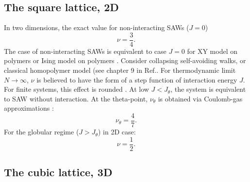\subsection{The square lattice, 2D}

In two dimensions, the exact value for non-interacting SAWs ($J=0$)\cite{Li1995}
\begin{equation}
\label{nur}
\nu = \frac{3}{4}. 
\end{equation}
The case of non-interacting SAWs is equivalent to case $J=0$ for XY model on polymers or Ising model on polymers   \cite{PhysRevE.104.054501}.  
Consider collapsing self-avoiding walks, or classical homopolymer model (see chapter 9 in Ref.\cite{van2015statistical}. For thermodynamic limit $N \rightarrow \infty $, $\nu$ is believed to have the form of a step function of interaction energy $J$. For finite systems, this effect is rounded \cite{vanderzande1998lattice}. At low $J < J_{\theta}$, the system is equivalent to SAW without interaction. At the theta-point, $\nu_{\theta}$  is obtained via Coulomb-gas approximations \cite{Duplantier1987}:
\begin{equation}
\label{nu_theta}
\nu_{\theta} = \frac{4}{7}.
\end{equation}  
For the globular regime ($J > J_{\theta}$) in 2D case:
\begin{equation}
\label{globular}
\nu = \frac{1}{2}.
\end{equation} 

\subsection{The cubic lattice, 3D}

